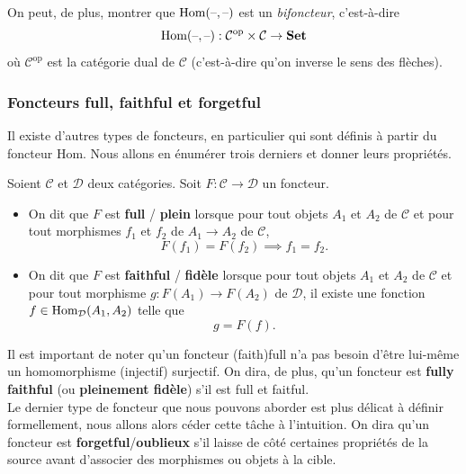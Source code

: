\documentclass{article}
\begin{document}
\noindent
On peut, de plus, montrer que $\text{Hom}(\text{--}, \text{--})$ est un \textit{bifoncteur}, c'est-à-dire
$$
\text{Hom}(\text{--},\text{--}):\mathcal C^{\text{op}}\times\mathcal C\to\textbf{Set}
$$
où $\mathcal C^\text{op}$ est la catégorie dual de $\mathcal C$ (c'est-à-dire qu'on inverse le sens des flèches).

\subsubsection{Foncteurs full, faithful et forgetful}
Il existe d'autres types de foncteurs, en particulier qui sont définis à partir du foncteur Hom. Nous allons en énumérer trois derniers et donner leurs propriétés.\\

\begin{definition}{}
    Soient $\mathcal C$ et $\mathcal D$ deux catégories. Soit $F:\mathcal C\to\mathcal D$ un foncteur.
    \begin{itemize}[label=\textbullet]
        \item On dit que $F$ est \textbf{full} / \textbf{plein} lorsque pour tout objets $A_1$ et $A_2$ de $\mathcal C$ et pour tout morphismes $f_1$ et $f_2$ de $A_1\to A_2$ de $\mathcal C$, $$F(f_1)=F(f_2)\implies f_1=f_2.$$
        \item On dit que $F$ est \textbf{faithful} / \textbf{fidèle} lorsque pour tout objets $A_1$ et $A_2$ de $\mathcal C$ et pour tout morphisme $g:F(A_1)\to F(A_2)$ de $\mathcal D$, il existe une fonction $f\in\text{Hom}_\mathcal D(A_1, A_2)$ telle que $$g=F(f).$$
    \end{itemize}
\end{definition}

Il est important de noter qu'un foncteur (faith)full n'a pas besoin d'être lui-même un homomorphisme (injectif) surjectif. On dira, de plus, qu'un foncteur est \textbf{fully faithful} (ou \textbf{pleinement fidèle}) s'il est full et faitful.\\

Le dernier type de foncteur que nous pouvons aborder est plus délicat à définir formellement, nous allons alors céder cette tâche à l'intuition. On dira qu'un foncteur est \textbf{forgetful}/\textbf{oublieux} s'il laisse de côté certaines propriétés de la source avant d'associer des morphismes ou objets à la cible.\\
\end{document}
